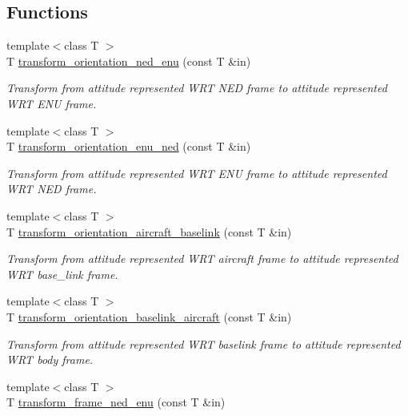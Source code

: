 \subsection*{Functions}
\begin{DoxyCompactItemize}
\item 
{\footnotesize template$<$class T $>$ }\\T \mbox{\hyperlink{group__nodelib_ga3c14c70db9b58d2aef2d9f84395bb876}{transform\+\_\+orientation\+\_\+ned\+\_\+enu}} (const T \&in)
\begin{DoxyCompactList}\small\item\em Transform from attitude represented W\+RT N\+ED frame to attitude represented W\+RT E\+NU frame. \end{DoxyCompactList}\item 
{\footnotesize template$<$class T $>$ }\\T \mbox{\hyperlink{group__nodelib_ga60f73ab88fd56337bf2572fe696d1d04}{transform\+\_\+orientation\+\_\+enu\+\_\+ned}} (const T \&in)
\begin{DoxyCompactList}\small\item\em Transform from attitude represented W\+RT E\+NU frame to attitude represented W\+RT N\+ED frame. \end{DoxyCompactList}\item 
{\footnotesize template$<$class T $>$ }\\T \mbox{\hyperlink{group__nodelib_ga01f847ac9369bb566b8f671ce7a9ec7c}{transform\+\_\+orientation\+\_\+aircraft\+\_\+baselink}} (const T \&in)
\begin{DoxyCompactList}\small\item\em Transform from attitude represented W\+RT aircraft frame to attitude represented W\+RT base\+\_\+link frame. \end{DoxyCompactList}\item 
{\footnotesize template$<$class T $>$ }\\T \mbox{\hyperlink{group__nodelib_ga52af05306da40938392b1536064458af}{transform\+\_\+orientation\+\_\+baselink\+\_\+aircraft}} (const T \&in)
\begin{DoxyCompactList}\small\item\em Transform from attitude represented W\+RT baselink frame to attitude represented W\+RT body frame. \end{DoxyCompactList}\item 
{\footnotesize template$<$class T $>$ }\\T \mbox{\hyperlink{group__nodelib_ga190188b4899aab8fde4d65de949535c9}{transform\+\_\+frame\+\_\+ned\+\_\+enu}} (const T \&in)

\end{DoxyCompactItemize}
